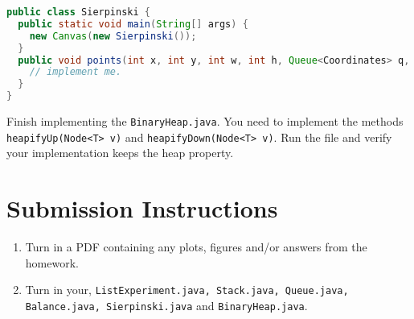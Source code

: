\documentclass{homework}
\begin{document}
\begin{lstlisting}[language=Java]
public class Sierpinski {
  public static void main(String[] args) {
    new Canvas(new Sierpinski());
  }
  public void points(int x, int y, int w, int h, Queue<Coordinates> q, int r) {
    // implement me.
  }
}
\end{lstlisting}

\question \sloppy Finish implementing the \texttt{BinaryHeap.java}. You need
to implement the methods \texttt{heapifyUp(Node<T> v)} and
\texttt{heapifyDown(Node<T> v)}. Run the file and verify your
implementation keeps the heap property.

\section*{Submission Instructions}

\begin{enumerate}
  \item Turn in a PDF containing any plots, figures and/or answers from
        the homework.
  \item Turn in your, \texttt{ListExperiment.java, Stack.java, Queue.java, Balance.java, Sierpinski.java} and \texttt{BinaryHeap.java}.
\end{enumerate}
\end{document}
